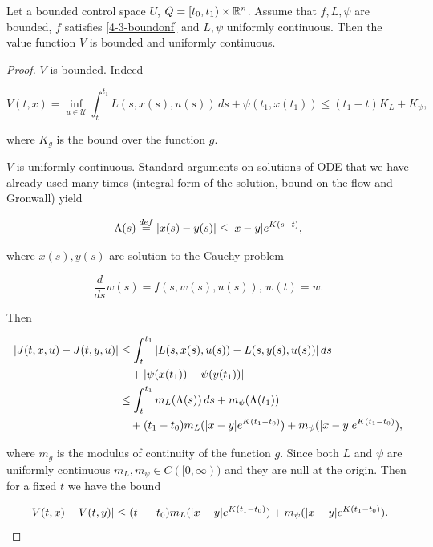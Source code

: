 \begin{theorem}\label{4-3-Theorem:1cont}
    Let a bounded control space $U$, $Q=[t_0,t_1)\times\mathbb{R}^n$. Assume that $f,L,\psi$ are bounded, $f$ satisfies \ref{4-3-boundonf} and $L,\psi$ uniformly continuous. 
    Then the value function $V$ is bounded and uniformly continuous.
    
    \begin{proof}
        $V$ is bounded. Indeed 

        \[V(t,x) = \inf_{u\in\mathcal{U}}\int_t^{t_1} L(s,x(s),u(s))\,ds + \psi(t_1,x(t_1)) \leq (t_1-t)K_L + K_{\psi},\]

        where $K_g$ is the bound over the function $g$. 

        $V$ is uniformly continuous. Standard arguments on solutions of ODE that we have already used many times (integral form of the solution, bound on the flow and Gronwall) yield 

        \begin{equation}
            \Lambda(s) \overset{def}{=} \abs{x(s)-y(s)} \leq \abs{x-y}e^{K(s-t)},
        \end{equation} 

        where $x(s),y(s)$ are solution to the Cauchy problem

        \[\frac{d}{ds}w(s) = f(s,w(s),u(s)),\, w(t)=w.\]

        Then

        \begin{align*}
            \abs{J(t,x,u) - J(t,y,u)} & \leq \int_t^{t_1} \abs{L(s,x(s),u(s)) - L(s,y(s), u(s))}\,ds \\
            & \quad + \abs{\psi(x(t_1)) - \psi(y(t_1))} \\
            & \leq \int_t^{t_1} m_L(\Lambda(s))\,ds + m_{\psi}(\Lambda(t_1)) \\
            & \quad + (t_1-t_0)m_L(\abs{x-y}e^{K(t_1-t_0)}) + m_{\psi}(\abs{x-y}e^{K(t_1-t_0)}),
        \end{align*}

        where $m_g$ is the modulus of continuity of the function $g$. Since both $L$ and $\psi$ are uniformly continuous $m_L,m_{\psi}\in C([0,\infty))$ and 
        they are null at the origin. Then for a fixed $t$ we have the bound
        
        \begin{equation}\label{4-3-InProof:modulust}
            \abs{V(t,x)-V(t,y)} \leq (t_1-t_0)m_L(\abs{x-y}e^{K(t_1-t_0)}) + m_{\psi}(\abs{x-y}e^{K(t_1-t_0)}).
        \end{equation}


\end{proof}
\end{theorem}

